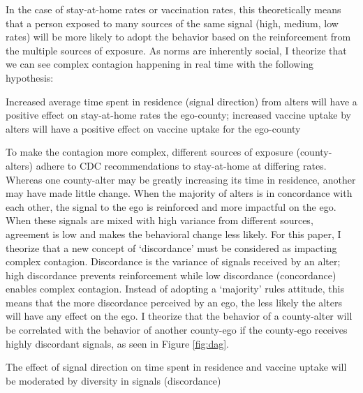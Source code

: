 In the case of stay-at-home rates or vaccination rates, this theoretically means
that a person exposed to many sources of the same signal (high, medium, low
rates) will be more likely to adopt the behavior based on the reinforcement from
the multiple sources of exposure. As norms are inherently social, I theorize
that we can see complex contagion happening in real time with the following
hypothesis:

\begin{hyp2} \label{hyp:direction}
Increased average time spent in residence (signal direction) from alters will have a positive effect on stay-at-home rates the ego-county; increased vaccine uptake by alters will have a positive effect on vaccine uptake for the ego-county
\end{hyp2}

To make the contagion more complex, different sources of exposure
(county-alters) adhere to CDC recommendations to stay-at-home at differing
rates. Whereas one county-alter may be greatly increasing its time in residence,
another may have made little change. When the majority of alters is in
concordance with each other, the signal to the ego is reinforced and more
impactful on the ego. When these signals are mixed with high variance from
different sources, agreement is low and makes the behavioral change less likely.
For this paper, I theorize that a new concept of `discordance' must be
considered as impacting complex contagion. Discordance is the variance of
signals received by an alter; high discordance prevents reinforcement while low
discordance (concordance) enables complex contagion. Instead of adopting a
`majority' rules attitude, this means that the more discordance perceived by an
ego, the less likely the alters will have any effect on the ego. I theorize that
the behavior of a county-alter will be correlated with the behavior
of another county-ego if the county-ego receives highly discordant signals, as
seen in Figure \ref{fig:dag}.

\begin{hyp2} \label{hyp:discordance}
The effect of signal direction on time spent in residence and vaccine uptake will be moderated by diversity in signals (discordance)
\end{hyp2}

